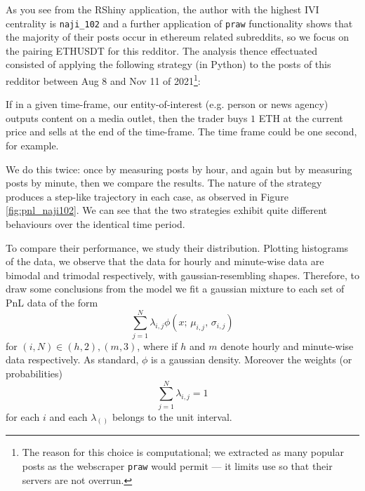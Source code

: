 \documentclass[twoside]{report}
\newcommand{\code}{\texttt}
\begin{document}
\begin{spacing}{1}
As you see from the RShiny application, the author with the highest IVI centrality is \code{naji\_102} and a further application of \code{praw} functionality shows that the majority of their posts occur in ethereum related subreddits, so we focus on the pairing ETHUSDT for this redditor. The analysis thence effectuated consisted of applying the following strategy (in Python) to the posts of this redditor between Aug 8 and Nov 11 of 2021\footnote{The reason for this choice is computational; we extracted as many popular posts as the webscraper \code{praw} would permit --- it limits use so that their servers are not overrun.}: \begin{strategy}
\label{PnLgeneralstrat}
If in a given time-frame, our entity-of-interest (e.g. person or news agency) outputs content on a media outlet, then the trader buys $1$ ETH at the current price and sells at the end of the time-frame. The time frame could be one second, for example. 
\end{strategy}
We do this twice: once by measuring posts by hour, and again but by measuring posts by minute, then we compare the results. The nature of the strategy produces a step-like trajectory in each case, as observed in Figure \ref{fig:pnl_naji102}. We can see that the two strategies exhibit quite different behaviours over the identical time period.




To compare their performance, we study their distribution. Plotting histograms of the data, we observe that the data for hourly and minute-wise data are bimodal and trimodal respectively, with gaussian-resembling shapes. Therefore, to draw some conclusions from the model we fit a gaussian mixture to each set of PnL data of the form \[
\sum_{j=1}^N \lambda_{i,j}\phi(x;\,\mu_{i,j},\, \sigma_{i,j})
\]
for $(i,N) \in {(h,2), (m,3)}$, where if $h$ and $m$ denote hourly and minute-wise data respectively. As standard, $\phi$ is a gaussian density. Moreover the weights (or probabilities) \[
\sum_{j=1}^N \lambda_{i,j} = 1
\]
for each $i$ and each $\lambda_{()}$ belongs to the unit interval.


\end{spacing}
\end{document}
